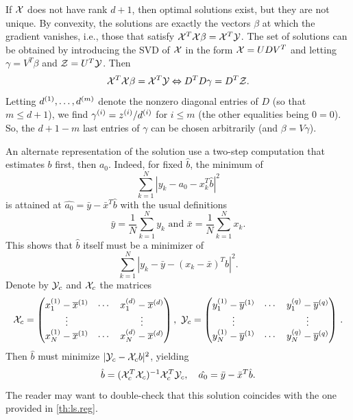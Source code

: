 \begin{remark}
\label{rem:linear.low.rank}
If ${\mathcal X}$ does not have rank $d+1$, then optimal solutions exist, but they are not unique. By convexity, the solutions are exactly the vectors $\beta$ at which the gradient vanishes, i.e., those  that satisfy ${\mathcal X}^T{\mathcal X} \beta = {\mathcal X}^T {\mathcal Y}$. The set of solutions can be obtained by introducing  the SVD of ${\mathcal X}$ in the form ${\mathcal X} = UDV^T$ and letting $\gamma = V^T\beta$ and ${\mathcal Z} = U^T {\mathcal Y}$. Then 
\[
{\mathcal X}^T{\mathcal X} \beta = {\mathcal X}^T {\mathcal Y}\Leftrightarrow D^TD \gamma = D^T {\mathcal Z}.
\]
Letting $d^{(1)} , \ldots, d^{(m)}$ denote the nonzero diagonal entries of $D$ (so that $m\leq d+1$), we  find $\gamma^{(i)}  = z^{(i)}  / d^{(i)} $ for $i\leq m$ (the other equalities being $0=0$). So, the $d+1-m$ last entries of $\gamma$ can be chosen arbitrarily (and $\beta = V\gamma$). 
\end{remark}


An alternate representation of the solution use a two-step computation that estimates $b$ first, then ${a_0}$. Indeed, for fixed $\hat b$, the minimum of 
\[
\sum_{k=1}^N |y_k - {a_0} - x_k^T \hat b|^2
\]
is attained at $\hat {a_0} = \bar y - \bar x^T \hat b$ with the usual definitions
$$\bar y = \frac{1}{N} \sum_{k=1}^N y_k \text{ and } \bar x =
\frac{1}{N} \sum_{k=1}^N x_k.
$$
This shows that $\hat b$ itself must be a minimizer of 
\[
\sum_{k=1}^N |y_k - \bar y - (x_k-\bar x)^T b|^2.
\]
Denote by ${\mathcal Y}_c$ and ${\mathcal X}_c$ the matrices 
\[
 \CX_c = \begin{pmatrix} \pe{x_1} 1 - \pe{\bx} 1 & \cdots & \pe {x_1} d - \pe \bx d  \\ \vdots && \vdots \\  \pe {x_N} 1 - \pe \bx 1  & \cdots & \pe{x_N} d - \pe \bx d \end{pmatrix}, \ %
 \CY_c = \begin{pmatrix} \pe {y_1} 1 - \pe \by 1  & \cdots & \pe{y_1}  q - \pe \by q  \\ \vdots && \vdots \\  \pe {y_N} 1 - \pe{\by} 1 & \cdots & \pe{y_N} q - \pe{\by} q \end{pmatrix}\,.
\]
Then $\hat b$ must minimize $|{\mathcal Y}_c - {\mathcal X}_c b|^2$, yielding
$$
\hat b = ({\mathcal X}_c^T{\mathcal X}_c)^{-1} {\mathcal X}_c^T \mathcal Y_c, \quad \hat {a_0} = \bar y - \bar x^T \hat b.
$$
The reader may want to double-check that 
this solution coincides with the one provided in  \cref{th:ls.reg}. 

